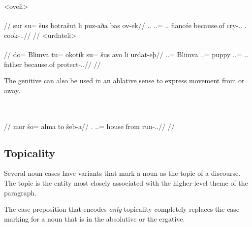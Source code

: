 	\a<oveli>\begingl
		\glpreamble{}\\
		\\
		//
		\gla sur su= šus botrašut li puz-aða bas ov-ek//
		\glb \Tps.\An.\Abs{} \An.\Sg.\Gen= \Tps.\An.\Gen{} fiancée because.of cry-\Ind.\Pst.\Prg{} \Rel.\Nrtrv{} cook-\Ind.\Pst.\Pfv//
		\glft{}//
	\endgl
	\a<urdateli>\begingl
		\glpreamble{}\\
		\\
		//
		\gla do= Blimva tu= okotik su= šus avo li urdat-eþ//
		\glb \An.\Sg.\Erg= Blimva \An.\Sg.\Acc= puppy \An.\Sg.\Gen= \Tps.\An.\Gen{} father because.of protect-\Ind.\Npst.\Prg//
		\glft{}//
	\endgl
\xe

The genitive can also be used in an ablative sense to express movement from or away.

	\begingl
		\glpreamble{}\\
		\\
		//
		\gla mor šo= alma to šeb-a//
		\glb \Fps.\An{} \In.\Sg.\Gen= house from run-\Ind.\Npst.\Ipfv//
		\glft{}//
	\endgl
\xe

\subsection{Topicality}
\label{subsec:tvk-nouns-topicality}

Several noun cases have variants that mark a noun as the topic of a discourse. The topic is the entity most closely associated with the higher-level theme of the paragraph.

The case preposition that encodes \emph{only} topicality completely replaces the case marking for a noun that is in the absolutive or the ergative.

